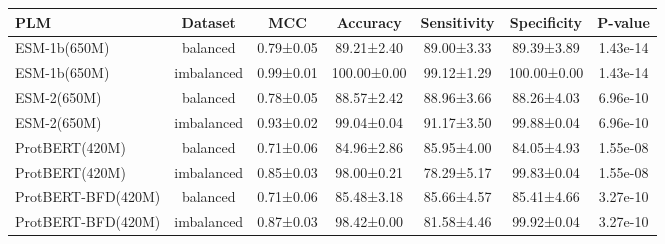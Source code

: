 \begin{tabular}{lcccccc}
\toprule
               PLM &    Dataset &       MCC &    Accuracy & Sensitivity & Specificity &  P-value \\
\midrule
      ESM-1b(650M) &   balanced & 0.79±0.05 &  89.21±2.40 &  89.00±3.33 &  89.39±3.89 & 1.43e-14 \\
      ESM-1b(650M) & imbalanced & 0.99±0.01 & 100.00±0.00 &  99.12±1.29 & 100.00±0.00 & 1.43e-14 \\
       ESM-2(650M) &   balanced & 0.78±0.05 &  88.57±2.42 &  88.96±3.66 &  88.26±4.03 & 6.96e-10 \\
       ESM-2(650M) & imbalanced & 0.93±0.02 &  99.04±0.04 &  91.17±3.50 &  99.88±0.04 & 6.96e-10 \\
    ProtBERT(420M) &   balanced & 0.71±0.06 &  84.96±2.86 &  85.95±4.00 &  84.05±4.93 & 1.55e-08 \\
    ProtBERT(420M) & imbalanced & 0.85±0.03 &  98.00±0.21 &  78.29±5.17 &  99.83±0.04 & 1.55e-08 \\
ProtBERT-BFD(420M) &   balanced & 0.71±0.06 &  85.48±3.18 &  85.66±4.57 &  85.41±4.66 & 3.27e-10 \\
ProtBERT-BFD(420M) & imbalanced & 0.87±0.03 &  98.42±0.00 &  81.58±4.46 &  99.92±0.04 & 3.27e-10 \\
\bottomrule
\end{tabular}
